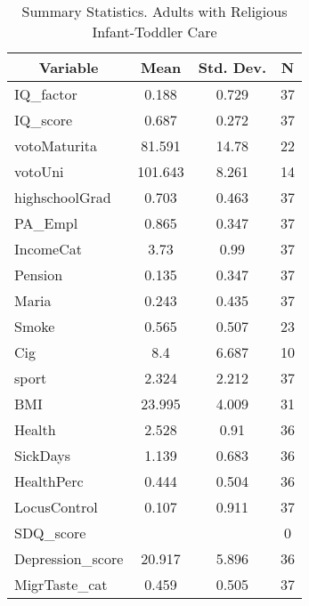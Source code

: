 
\begin{table}[htbp]\centering \caption{Summary Statistics. Adults with Religious Infant-Toddler Care \label{schoolAdultasiloReli}}
\begin{tabular}{l c c  c}\hline\hline
\multicolumn{1}{c}{\textbf{Variable}} & \textbf{Mean}
 & \textbf{Std. Dev.} & \textbf{N}\\ \hline
IQ\_factor & 0.188 & 0.729  & 37\\
IQ\_score & 0.687 & 0.272  & 37\\
votoMaturita & 81.591 & 14.78  & 22\\
votoUni & 101.643 & 8.261  & 14\\
highschoolGrad & 0.703 & 0.463  & 37\\
PA\_Empl & 0.865 & 0.347  & 37\\
IncomeCat & 3.73 & 0.99  & 37\\
Pension & 0.135 & 0.347  & 37\\
Maria & 0.243 & 0.435  & 37\\
Smoke & 0.565 & 0.507  & 23\\
Cig & 8.4 & 6.687  & 10\\
sport & 2.324 & 2.212  & 37\\
BMI & 23.995 & 4.009  & 31\\
Health & 2.528 & 0.91  & 36\\
SickDays & 1.139 & 0.683  & 36\\
HealthPerc & 0.444 & 0.504  & 36\\
LocusControl & 0.107 & 0.911  & 37\\
SDQ\_score &  &   & 0\\
Depression\_score & 20.917 & 5.896  & 36\\
MigrTaste\_cat & 0.459 & 0.505  & 37\\
\hline\end{tabular}
\end{table}
